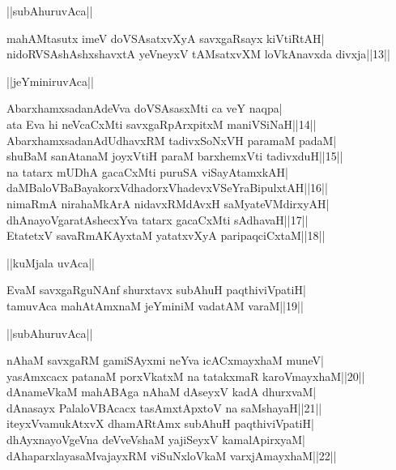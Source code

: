 \documentclass{article}
\begin{document}
\begin{center}
||subAhuruvAca||
\end{center}

mahAMtasutx imeV doVSAsatxvXyA savxgaRsayx kiVtiRtAH|\\
nidoRVSAshAshxshavxtA yeVneyxV tAMsatxvXM loVkAnavxda divxja||13||\\

\begin{center}
||jeYminiruvAca||
\end{center}

AbarxhamxsadanAdeVva doVSAsasxMti ca veY naqpa|\\
ata Eva hi neVcaCxMti savxgaRpArxpitxM maniVSiNaH||14||\\
AbarxhamxsadanAdUdhavxRM tadivxSoNxVH paramaM padaM|\\
shuBaM sanAtanaM joyxVtiH paraM barxhemxVti tadivxduH||15||\\
na tatarx mUDhA gacaCxMti puruSA viSayAtamxkAH|\\
daMBaloVBaBayakorxVdhadorxVhadevxVSeYraBipulxtAH||16||\\
nimaRmA nirahaMkArA nidavxRMdAvxH saMyateVMdirxyAH|\\
dhAnayoVgaratAshecxYva tatarx gacaCxMti sAdhavaH||17||\\
EtatetxV savaRmAKAyxtaM yatatxvXyA paripaqciCxtaM||18||\\

\begin{center}
||kuMjala uvAca||
\end{center}

EvaM savxgaRguNAnf shurxtavx subAhuH paqthiviVpatiH|\\
tamuvAca mahAtAmxnaM jeYminiM vadatAM varaM||19||\\

\begin{center}
||subAhuruvAca||
\end{center}

nAhaM savxgaRM gamiSAyxmi neYva icACxmayxhaM muneV|\\
yasAmxcacx patanaM porxVkatxM na tatakxmaR karoVmayxhaM||20||\\
dAnameVkaM mahABAga nAhaM dAseyxV kadA dhurxvaM|\\
dAnasayx PalaloVBAcacx tasAmxtApxtoV na saMshayaH||21||\\
iteyxVvamukAtxvX dhamARtAmx subAhuH paqthiviVpatiH|\\
dhAyxnayoVgeVna deVveVshaM yajiSeyxV kamalApirxyaM|\\
dAhaparxlayasaMvajayxRM viSuNxloVkaM varxjAmayxhaM||22||\\
\end{document}
